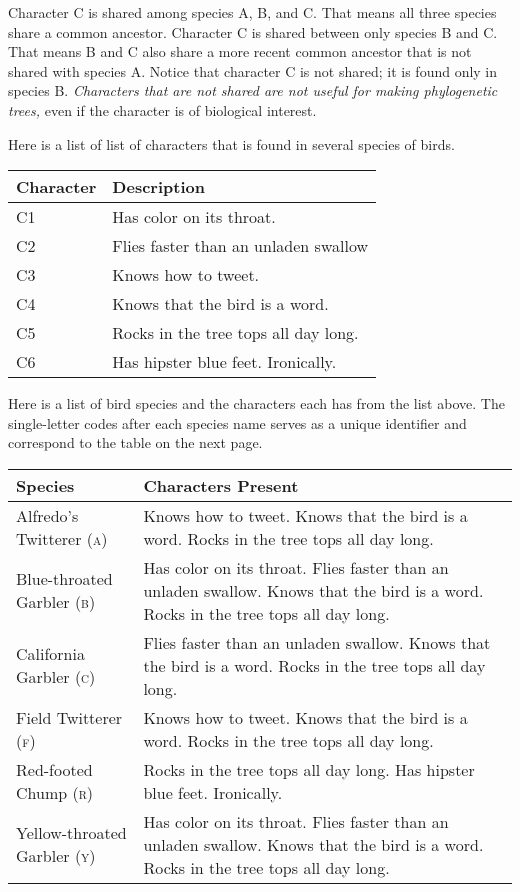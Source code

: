 \documentclass[12pt, hidelinks]{exam}
\begin{document}
Character C{} is shared among species A, B, and C. That means all three species share a common ancestor. Character C{} is shared between only species B and C. That means B and C also share a more recent common ancestor that is not shared with species A. Notice that character C{} is not shared; it is found only in species B. \emph{Characters that are not shared are not useful for making phylogenetic trees,} even if the character is of biological interest.

\newpage

Here is a list of list of characters that is found in several species of birds. 

{\liningnum
\begin{tabular}{ll}
\toprule
Character	&	Description	\tabularnewline
\midrule
C1	&	Has color on its throat.	\tabularnewline
C2	&	Flies faster than an unladen swallow \tabularnewline
C3	&	Knows how to tweet. \tabularnewline
C4	&	Knows that the bird is a word. \tabularnewline
C5	&	Rocks in the tree tops all day long. \tabularnewline
C6	&	Has hipster blue feet. Ironically. \tabularnewline
\bottomrule
\end{tabular}
}

\vspace{\baselineskip}

Here is a list of bird species and the characters each has from the list above. The single-letter codes after each species name serves as a unique identifier and correspond to the table on the next page.

\begin{longtable}[l]{@{}lL{3.5in}@{}}
\toprule
Species	&	Characters Present	\tabularnewline
\midrule
Alfredo's Twitterer \textsc{(a)} & Knows how to tweet. Knows that the bird is a word. Rocks in the tree tops all day long.\tabularnewline
Blue-throated Garbler \textsc{(b)} & Has color on its throat. Flies faster than an unladen swallow. Knows that the bird is a word. Rocks in the tree tops all day long. \tabularnewline
California Garbler \textsc{(c)} & Flies faster than an unladen swallow. Knows that the bird is a word. Rocks in the tree tops all day long. \tabularnewline
Field Twitterer \textsc{(f)} & Knows how to tweet. Knows that the bird is a word. Rocks in the tree tops all day long. \tabularnewline
Red-footed Chump \textsc{(r)} & Rocks in the tree tops all day long. Has hipster blue feet. Ironically. \tabularnewline
Yellow-throated Garbler \textsc{(y)} & Has color on its throat. Flies faster than an unladen swallow. Knows that the bird is a word. Rocks in the tree tops all day long. \tabularnewline
\bottomrule
\end{longtable}
\end{document}
